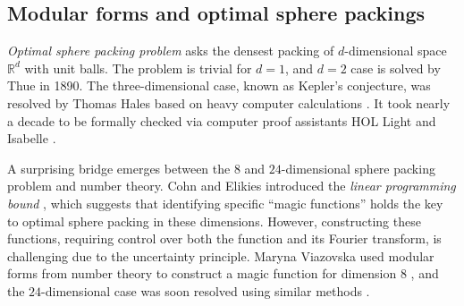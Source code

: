 \documentclass[12pt]{article}
\begin{document}



\subsection*{Modular forms and optimal sphere packings}

\emph{Optimal sphere packing problem} asks the densest packing of $d$-dimensional space $\mathbb{R}^{d}$ with unit balls.
The problem is trivial for $d = 1$, and $d = 2$ case is solved by Thue in 1890.
The three-dimensional case, known as Kepler's conjecture, was resolved by Thomas Hales based on heavy computer calculations \cite{hales2005proof}.
It took nearly a decade to be formally checked via computer proof assistants HOL Light and Isabelle \cite{hales2017formal}.


A surprising bridge emerges between the $8$ and $24$-dimensional sphere packing problem and number theory. 
Cohn and Elikies introduced the \emph{linear programming bound}  \cite{cohn2003new}, which suggests that identifying specific ``magic functions'' holds the key to optimal sphere packing in these dimensions. 
However, constructing these functions, requiring control over both the function and its Fourier transform, is challenging due to the uncertainty principle.
Maryna Viazovska used modular forms from number theory to construct a magic function for dimension $8$ \cite{viazovska2017sphere}, and the $24$-dimensional case was soon resolved using similar methods \cite{cohn2017sphere}.
\end{document}
